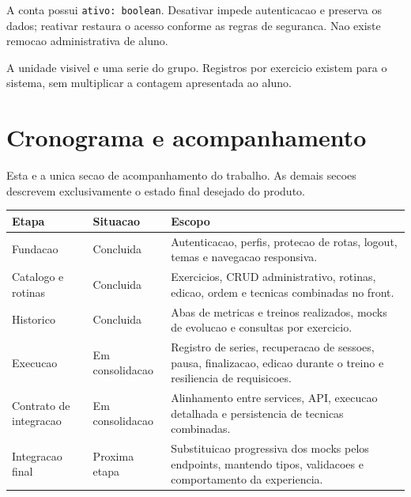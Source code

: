 \documentclass[12pt,a4paper]{article}
\begin{document}
\begin{regra}
A conta possui \texttt{ativo: boolean}. Desativar impede autenticacao e preserva os dados; reativar restaura o acesso conforme as regras de seguranca. Nao existe remocao administrativa de aluno.
\end{regra}

\begin{regra}
A unidade visivel e uma serie do grupo. Registros por exercicio existem para o sistema, sem multiplicar a contagem apresentada ao aluno.
\end{regra}

\section{Cronograma e acompanhamento}

Esta e a unica secao de acompanhamento do trabalho. As demais secoes descrevem exclusivamente o estado final desejado do produto.

\begin{longtable}{L{0.22\textwidth} L{0.28\textwidth} L{0.39\textwidth}}
\toprule
Etapa & Situacao & Escopo \\
\midrule
Fundacao & Concluida & Autenticacao, perfis, protecao de rotas, logout, temas e navegacao responsiva. \\
Catalogo e rotinas & Concluida & Exercicios, CRUD administrativo, rotinas, edicao, ordem e tecnicas combinadas no front. \\
Historico & Concluida & Abas de metricas e treinos realizados, mocks de evolucao e consultas por exercicio. \\
Execucao & Em consolidacao & Registro de series, recuperacao de sessoes, pausa, finalizacao, edicao durante o treino e resiliencia de requisicoes. \\
Contrato de integracao & Em consolidacao & Alinhamento entre services, API, execucao detalhada e persistencia de tecnicas combinadas. \\
Integracao final & Proxima etapa & Substituicao progressiva dos mocks pelos endpoints, mantendo tipos, validacoes e comportamento da experiencia. \\
\bottomrule
\end{longtable}
\end{document}
